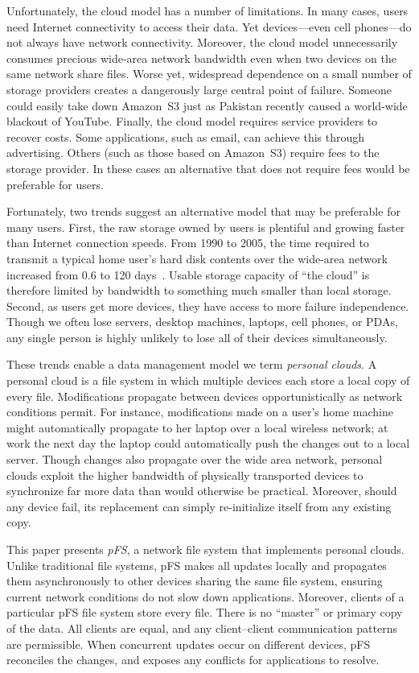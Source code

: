 Unfortunately, the cloud model has a number of limitations.  In many
cases, users need Internet connectivity to access their data.  Yet
devices---even cell phones---do not always have network connectivity.
Moreover, the cloud model unnecessarily consumes precious wide-area
network bandwidth even when two devices on the same network share
files.  Worse yet, widespread dependence on a small number of storage
providers creates a dangerously large central point of failure.
Someone could easily take down Amazon~S3 just as Pakistan recently
caused a world-wide blackout of YouTube.  Finally, the cloud model
requires service providers to recover costs.  Some applications, such
as email, can achieve this through advertising.  Others (such as those
based on Amazon~S3) require fees to the storage provider.  In these
cases an alternative that does not require fees would be preferable
for users.

Fortunately, two trends suggest an alternative model that may be
preferable for many users.  First, the raw storage owned by users is
plentiful and growing faster than Internet connection speeds.  From
1990 to 2005, the time required to transmit a typical home user's hard
disk contents over the wide-area network increased from 0.6 to 120
days~\cite{rodrigues:multi-hop}.  Usable storage capacity of ``the
cloud'' is therefore limited by bandwidth to something much smaller
than local storage.  Second, as users get more devices, they have
access to more failure independence.  Though we often lose servers,
desktop machines, laptops, cell phones, or PDAs, any single person is
highly unlikely to lose all of their devices simultaneously.

These trends enable a data management model we term \emph{personal
  clouds}.  A personal cloud is a file system in which multiple
devices each store a local copy of every file.  Modifications
propagate between devices opportunistically as network conditions
permit.  For instance, modifications made on a user's home machine
might automatically propagate to her laptop over a local wireless
network; at work the next day the laptop could automatically push the
changes out to a local server.  Though changes also propagate over the
wide area network, personal clouds exploit the higher bandwidth of
physically transported devices to synchronize far more data than would
otherwise be practical.  Moreover, should any device fail, its
replacement can simply re-initialize itself from any existing copy.

This paper presents \emph{pFS}, a network file system that implements
personal clouds.  Unlike traditional file systems, pFS makes all
updates locally and propagates them asynchronously to other devices
sharing the same file system, ensuring current network conditions do
not slow down applications.  Moreover, clients of a particular pFS
file system store every file.  There is no ``master'' or primary copy
of the data.  All clients are equal, and any client--client
communication patterns are permissible.  When concurrent updates occur
on different devices, pFS reconciles the changes, and exposes any
conflicts for applications to resolve.


